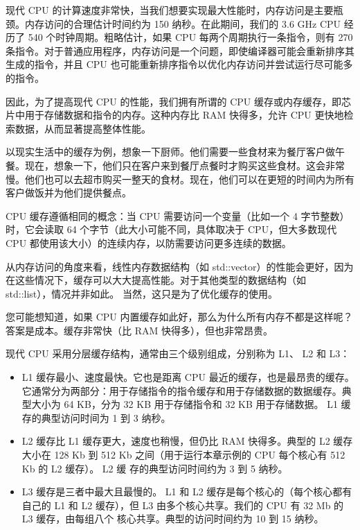 
现代 CPU 的计算速度非常快，当我们想要实现最大性能时，内存访问是主要瓶颈。内存访问的合理估计时间约为 150 纳秒。在此期间，我们的 3.6 GHz CPU 经历了 540 个时钟周期。粗略估计，如果 CPU 每两个周期执行一条指令，则有 270 条指令。对于普通应用程序，内存访问是一个问题，即使编译器可能会重新排序其生成的指令，并且 CPU 也可能重新排序指令以优化内存访问并尝试运行尽可能多的指令。

因此，为了提高现代 CPU 的性能，我们拥有所谓的 CPU 缓存或内存缓存，即芯片中用于存储数据和指令的内存。这种内存比 RAM 快得多，允许 CPU 更快地检索数据，从而显著提高整体性能。

以现实生活中的缓存为例，想象一下厨师。他们需要一些食材来为餐厅客户做午餐。现在，想象一下，他们只在客户来到餐厅点餐时才购买这些食材。这会非常慢。他们也可以去超市购买一整天的食材。现在，他们可以在更短的时间内为所有客户做饭并为他们提供餐点。

CPU 缓存遵循相同的概念：当 CPU 需要访问一个变量（比如一个 4 字节整数）时，它会读取 64 个字节（此大小可能不同，具体取决于 CPU，但大多数现代 CPU 都使用该大小）的连续内存，以防需要访问更多连续的数据。

从内存访问的角度来看，线性内存数据结构（如 std::vector）的性能会更好，因为在这些情况下，缓存可以大大提高性能。对于其他类型的数据结构（如 std::list），情况并非如此。
当然，这只是为了优化缓存的使用。

您可能想知道，如果 CPU 内置缓存如此好，那么为什么所有内存不都是这样呢？答案是成本。缓存非常快（比 RAM 快得多），但也非常昂贵。

现代 CPU 采用分层缓存结构，通常由三个级别组成，分别称为 L1、 L2 和 L3：

\begin{itemize}
\item
L1 缓存最小、速度最快。它也是距离 CPU 最近的缓存，也是最昂贵的缓存。它通常分为两部分：用于存储指令的指令缓存和用于存储数据的数据缓存。典型大小为 64 KB，分为 32 KB 用于存储指令和 32 KB 用于存储数据。 L1 缓存的典型访问时间为 1 到 3 纳秒。

\item
L2 缓存比 L1 缓存更大，速度也稍慢，但仍比 RAM 快得多。典型的 L2 缓存大小在 128
Kb 到 512 Kb 之间（用于运行本章示例的 CPU 每个核心有 512 Kb 的 L2 缓存）。 L2 缓
存的典型访问时间约为 3 到 5 纳秒。

\item
L3 缓存是三者中最大且最慢的。 L1 和 L2 缓存是每个核心的（每个核心都有自己的 L1
和 L2 缓存），但 L3 由多个核心共享。我们的 CPU 有 32 Mb 的 L3 缓存，由每组八个
核心共享。典型的访问时间约为 10 到 15 纳秒。
\end{itemize}

